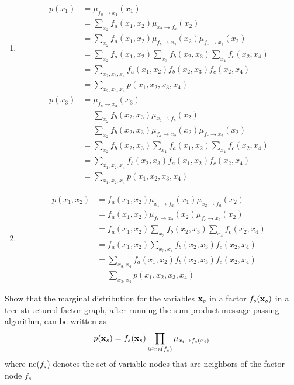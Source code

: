 \documentclass{amsmlaj}
\begin{document}
\begin{problem}
\begin{sol}
	\begin{enumerate}
		\item
			\begin{align}
				p(x_1)
				&=\mu_{f_a \to x_1}(x_1) \\
				&=\sum_{x_2} f_a(x_1,x_2) \mu_{x_2 \to f_a}(x_2) \\
				&=\sum_{x_2} f_a(x_1,x_2) \mu_{f_b \to x_2}(x_2) \mu_{f_c \to x_2}(x_2) \\
				&=\sum_{x_2} f_a(x_1,x_2) \sum_{x_3}f_b(x_2,x_3) \sum_{x_4}f_c(x_2,x_4) \\
				&=\sum_{x_2,x_3,x_4}f_a(x_1,x_2)f_b(x_2,x_3)f_c(x_2,x_4) \\
				&=\sum_{x_2,x_3,x_4}p(x_1,x_2,x_3,x_4)
			\end{align}
			\begin{align}
				p(x_3)
				&=\mu_{f_b \to x_3}(x_3) \\
				&=\sum_{x_2}f_b(x_2,x_3) \mu_{x_2 \to f_b}(x_2) \\
				&=\sum_{x_2}f_b(x_2,x_3) \mu_{f_a \to x_2}(x_2) \mu_{f_c \to x_2}(x_2) \\
				&=\sum_{x_2}f_b(x_2,x_3) \sum_{x_1}f_a(x_1,x_2) \sum_{x_4}f_c(x_2,x_4) \\
				&=\sum_{x_1, x_2, x_4} f_b(x_2,x_3) f_a(x_1,x_2) f_c(x_2,x_4) \\
				&=\sum_{x_1,x_2,x_4} p(x_1,x_2,x_3,x_4)
			\end{align}
		\item
			\begin{align}
				p(x_1,x_2)
				&=f_a(x_1,x_2) \mu_{x_1 \to f_a}(x_1) \mu_{x_2 \to f_a}(x_2) \\
				&=f_a(x_1,x_2) \mu_{f_b \to x_2}(x_2) \mu_{f_c \to x_2}(x_2) \\
				&=f_a(x_1,x_2) \sum_{x_3} f_b(x_2,x_3) \sum_{x_4} f_c(x_2,x_4) \\
				&=f_a(x_1,x_2) \sum_{x_3,x_4} f_b(x_2,x_3) f_c(x_2,x_4) \\
				&=\sum_{x_3,x_4} f_a(x_1,x_2) f_b(x_2,x_3) f_c(x_2,x_4) \\
				&=\sum_{x_3,x_4} p(x_1,x_2,x_3,x_4)
			\end{align}
	\end{enumerate}
\end{sol}

\end{problem}

\begin{problem}
Show that the marginal distribution for the variables $\bm{\mathbf{x}}_s$ in a factor
$f_s(\bm{\mathbf{x}}_s)$ in a tree-structured factor graph, after running the sum-product
message passing algorithm, can be written as
\[
p(\bm{\mathbf{x}}_s) = f_s(\bm{\mathbf{x}}_s) \prod\limits_{i \in \text{ne}(f_s)} \mu_{x_i \to f_s(x_i)}
\]
where ne($f_s$) denotes the set of variable nodes that are neighbors of the factor node $f_s$
\end{problem}
\end{document}
